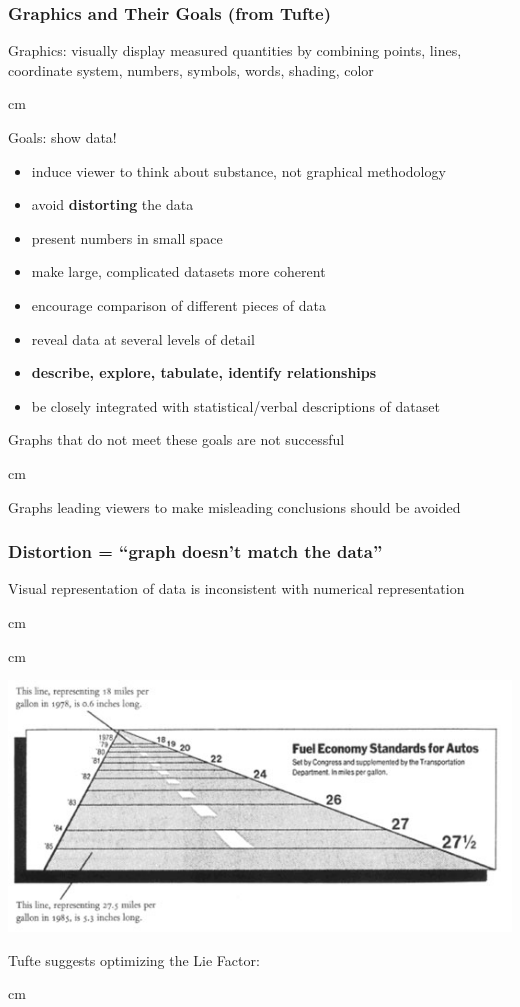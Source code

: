 \documentclass{beamer} %
\begin{document}
\begin{frame}\frametitle{Graphics and Their Goals (from Tufte)}
	\small
	
	Graphics:  visually display measured quantities by combining points, lines, coordinate system, numbers, symbols, words, shading, color
	
	 cm
	
	Goals:  show data!
	
	\begin{itemize}
		\item induce viewer to think about substance, not graphical methodology
		\item avoid \textbf{distorting} the data
		\item present numbers in small space
		\item make large, complicated datasets more coherent
		\item encourage comparison of different pieces of data
		\item reveal data at several levels of detail
		\item \textbf{describe, explore, tabulate, identify relationships}
		\item be closely integrated with statistical/verbal descriptions of dataset
	\end{itemize}
	
	Graphs that do not meet these goals are not successful
	
	 cm
	
	Graphs leading viewers to make misleading conclusions should be avoided
	
\end{frame}



\begin{frame}\frametitle{Distortion = ``graph doesn't match the data''}
	\small
	
	Visual representation of data is inconsistent with numerical representation
	
	 cm

	 cm
	
	\includegraphics[width=0.71\linewidth]{fuel.jpg}
	
	Tufte suggests optimizing the Lie Factor:
	
	 cm
	
\end{frame}
\end{document}
